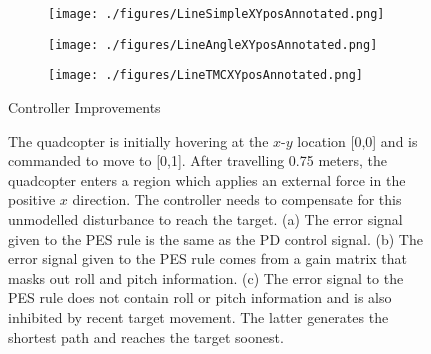 \documentclass[letterpaper, 10 pt, conference]{ieeeconf}  %
\begin{document}
\begin{figure}
\centering
\begin{subfigure}[t]{0.15\textwidth}
\texttt{[image: ./figures/LineSimpleXYposAnnotated.png]}
\caption{}
\label{fig:ImprovementComparisonA}
\end{subfigure}
\begin{subfigure}[t]{0.15\textwidth}
\texttt{[image: ./figures/LineAngleXYposAnnotated.png]}
\caption{}
\label{fig:ImprovementComparisonB}
\end{subfigure}
\begin{subfigure}[t]{0.15\textwidth}
\texttt{[image: ./figures/LineTMCXYposAnnotated.png]}
\caption{}
\label{fig:ImprovementComparisonC}
\end{subfigure}
\caption{Controller Improvements}
\label{fig:ImprovementComparison}
\captionsetup{singlelinecheck=off,font=footnotesize}
\caption*{The quadcopter is initially hovering at the $x$-$y$ location [0,0] and is commanded to move to [0,1]. After travelling 0.75 meters, the quadcopter enters a region which applies an external force in the positive $x$ direction. The controller needs to compensate for this unmodelled disturbance to reach the target. (a) The error signal given to the PES rule is the same as the PD control signal. (b) The error signal given to the PES rule comes from a gain matrix that masks out roll and pitch information. (c) The error signal to the PES rule does not contain roll or pitch information and is also inhibited by recent target movement. The latter generates the shortest path and reaches the target soonest.}
\end{figure}
\end{document}
